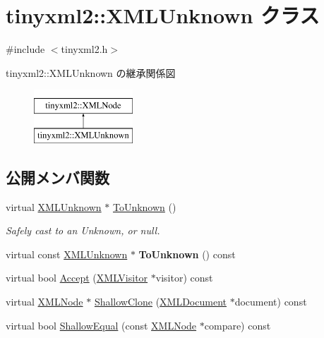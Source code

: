 \hypertarget{classtinyxml2_1_1_x_m_l_unknown}{}\section{tinyxml2\+:\+:X\+M\+L\+Unknown クラス}
\label{classtinyxml2_1_1_x_m_l_unknown}


{\ttfamily \#include $<$tinyxml2.\+h$>$}

tinyxml2\+:\+:X\+M\+L\+Unknown の継承関係図\begin{figure}[H]
\begin{center}
\leavevmode
\includegraphics[height=2.000000cm]{classtinyxml2_1_1_x_m_l_unknown}
\end{center}
\end{figure}
\subsection*{公開メンバ関数}
\begin{DoxyCompactItemize}
\item 
\mbox{\label{classtinyxml2_1_1_x_m_l_unknown_af4374856421921cad578c8affae872b6}} 
virtual \hyperlink{classtinyxml2_1_1_x_m_l_unknown}{X\+M\+L\+Unknown} $\ast$ \hyperlink{classtinyxml2_1_1_x_m_l_unknown_af4374856421921cad578c8affae872b6}{To\+Unknown} ()
\begin{DoxyCompactList}\small\item\em Safely cast to an Unknown, or null. \end{DoxyCompactList}\item 
\mbox{\label{classtinyxml2_1_1_x_m_l_unknown_a61b342b4f295cded1dc2f4402e97f07e}} 
virtual const \hyperlink{classtinyxml2_1_1_x_m_l_unknown}{X\+M\+L\+Unknown} $\ast$ {\bfseries To\+Unknown} () const
\item 
virtual bool \hyperlink{classtinyxml2_1_1_x_m_l_unknown_a8a06b8c82117ca969a432e17a46830fc}{Accept} (\hyperlink{classtinyxml2_1_1_x_m_l_visitor}{X\+M\+L\+Visitor} $\ast$visitor) const
\item 
virtual \hyperlink{classtinyxml2_1_1_x_m_l_node}{X\+M\+L\+Node} $\ast$ \hyperlink{classtinyxml2_1_1_x_m_l_unknown_ab73b48b819aa4b2ef3815dc2d7d20d5f}{Shallow\+Clone} (\hyperlink{classtinyxml2_1_1_x_m_l_document}{X\+M\+L\+Document} $\ast$document) const
\item 
virtual bool \hyperlink{classtinyxml2_1_1_x_m_l_unknown_ac46767cd721d666e690a6231dfb618d1}{Shallow\+Equal} (const \hyperlink{classtinyxml2_1_1_x_m_l_node}{X\+M\+L\+Node} $\ast$compare) const
\end{DoxyCompactItemize}
